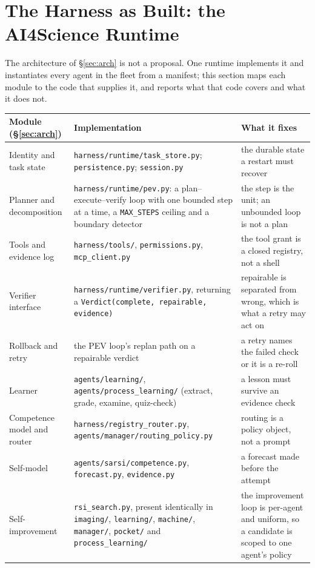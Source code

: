 \documentclass[11pt]{article}
\theoremstyle{definition}
\begin{document}
\section{The Harness as Built: the AI4Science Runtime}\label{sec:ai4science}

The architecture of \S\ref{sec:arch} is not a proposal. One runtime implements it and instantiates every agent in the fleet from a manifest; this section maps each module to the code that supplies it, and reports what that code covers and what it does not.

\begin{table}[!htbp]
\centering\scriptsize
\begin{tabularx}{\textwidth}{@{}lYY@{}}
\toprule
Module (\S\ref{sec:arch}) & Implementation & What it fixes \\
\midrule
Identity and task state & \texttt{harness/runtime/task\_store.py}; \texttt{persistence.py}; \texttt{session.py} & the durable state a restart must recover \\
Planner and decomposition & \texttt{harness/runtime/pev.py}: a plan--execute--verify loop with one bounded step at a time, a \texttt{MAX\_STEPS} ceiling and a boundary detector & the step is the unit; an unbounded loop is not a plan \\
Tools and evidence log & \texttt{harness/tools/}, \texttt{permissions.py}, \texttt{mcp\_client.py} & the tool grant is a closed registry, not a shell \\
Verifier interface & \texttt{harness/runtime/verifier.py}, returning a \texttt{Verdict(complete, repairable, evidence)} & repairable is separated from wrong, which is what a retry may act on \\
Rollback and retry & the PEV loop's replan path on a repairable verdict & a retry names the failed check or it is a re-roll \\
Learner & \texttt{agents/learning/}, \texttt{agents/process\_learning/} (extract, grade, examine, quiz-check) & a lesson must survive an evidence check \\
Competence model and router & \texttt{harness/registry\_router.py}, \texttt{agents/manager/routing\_policy.py} & routing is a policy object, not a prompt \\
Self-model & \texttt{agents/sarsi/competence.py}, \texttt{forecast.py}, \texttt{evidence.py} & a forecast made before the attempt \\
Self-improvement & \texttt{rsi\_search.py}, present identically in \texttt{imaging/}, \texttt{learning/}, \texttt{machine/}, \texttt{manager/}, \texttt{pocket/} and \texttt{process\_learning/} & the improvement loop is per-agent and uniform, so a candidate is scoped to one agent's policy \\

\end{tabularx}
\end{table}
\end{document}
